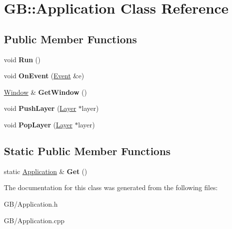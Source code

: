 \hypertarget{class_g_b_1_1_application}{}\section{GB\+::Application Class Reference}
\label{class_g_b_1_1_application}
\subsection*{Public Member Functions}
\begin{DoxyCompactItemize}
\item 
\mbox{\label{class_g_b_1_1_application_a6f0d4206898b2cef32c67e2091e19542}} 
void {\bfseries Run} ()
\item 
\mbox{\label{class_g_b_1_1_application_a2080d11ae5893e811776a4e24844b804}} 
void {\bfseries On\+Event} (\mbox{\hyperlink{class_g_b_1_1_event}{Event}} \&e)
\item 
\mbox{\label{class_g_b_1_1_application_a5af1181508a43bd06524272dc73dfa60}} 
\mbox{\hyperlink{class_g_b_1_1_window}{Window}} \& {\bfseries Get\+Window} ()
\item 
\mbox{\label{class_g_b_1_1_application_a69296ff7a4ecc3d4d5b036428e041b8a}} 
void {\bfseries Push\+Layer} (\mbox{\hyperlink{class_g_b_1_1_layer}{Layer}} $\ast$layer)
\item 
\mbox{\label{class_g_b_1_1_application_a302163f3adb722368f50408797207dd6}} 
void {\bfseries Pop\+Layer} (\mbox{\hyperlink{class_g_b_1_1_layer}{Layer}} $\ast$layer)
\end{DoxyCompactItemize}
\subsection*{Static Public Member Functions}
\begin{DoxyCompactItemize}
\item 
\mbox{\label{class_g_b_1_1_application_a8ab4a8d90a228165361ad12c99e75ca2}} 
static \mbox{\hyperlink{class_g_b_1_1_application}{Application}} \& {\bfseries Get} ()
\end{DoxyCompactItemize}


The documentation for this class was generated from the following files\+:\begin{DoxyCompactItemize}
\item 
G\+B/Application.\+h\item 
G\+B/Application.\+cpp\end{DoxyCompactItemize}
